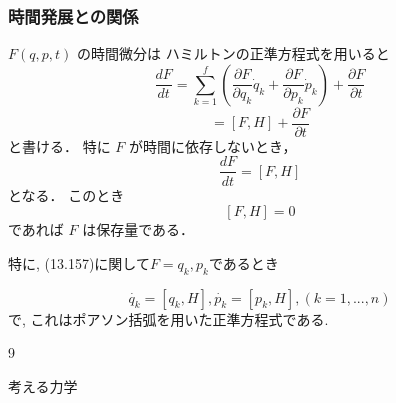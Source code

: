 \documentclass[a4paper,12pt]{jlreq}
\begin{document}
\subsubsection{時間発展との関係}
$F(q,p,t)$ の時間微分は
ハミルトンの正準方程式を用いると
\[
  \frac{dF}{dt}
  = \sum_{k=1}^f
    \left(
      \frac{\partial F}{\partial q_k}\dot q_k
      +\frac{\partial F}{\partial p_k}\dot p_k
    \right)
  + \frac{\partial F}{\partial t}
\]
\[
  = [F,H] + \frac{\partial F}{\partial t}
\tag{13.156}
\]
と書ける．
特に $F$ が時間に依存しないとき，
\[
  \frac{dF}{dt} = [F,H]
\tag{13.157}
\]
となる．
このとき
\[
  [F,H]=0
\tag{13.158}
\]
であれば $F$ は保存量である．

特に, (13.157)に関して$F = q_k, p_k$であるとき

\[
  \dot{q_k} = [q_k,H],　\dot{p_k} = [p_k,H],　(k = 1,..., n)
  \tag{13.159}
\]
で, これはポアソン括弧を用いた正準方程式である.









 


\begin{thebibliography}{9}


考える力学



\end{thebibliography}
\end{document}
